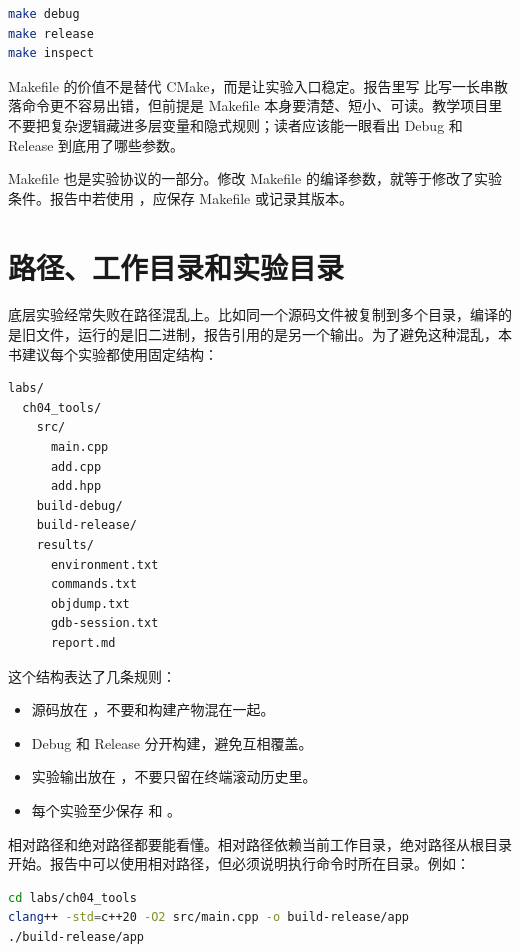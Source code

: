 \begin{lstlisting}[language=bash]
make debug
make release
make inspect
\end{lstlisting}

Makefile 的价值不是替代 CMake，而是让实验入口稳定。报告里写  比写一长串散落命令更不容易出错，但前提是 Makefile 本身要清楚、短小、可读。教学项目里不要把复杂逻辑藏进多层变量和隐式规则；读者应该能一眼看出 Debug 和 Release 到底用了哪些参数。

\begin{warningbox}
Makefile 也是实验协议的一部分。修改 Makefile 的编译参数，就等于修改了实验条件。报告中若使用 ，应保存 Makefile 或记录其版本。
\end{warningbox}

\section{路径、工作目录和实验目录}

底层实验经常失败在路径混乱上。比如同一个源码文件被复制到多个目录，编译的是旧文件，运行的是旧二进制，报告引用的是另一个输出。为了避免这种混乱，本书建议每个实验都使用固定结构：

\begin{lstlisting}
labs/
  ch04_tools/
    src/
      main.cpp
      add.cpp
      add.hpp
    build-debug/
    build-release/
    results/
      environment.txt
      commands.txt
      objdump.txt
      gdb-session.txt
      report.md
\end{lstlisting}

这个结构表达了几条规则：

\begin{itemize}
  \item 源码放在 ，不要和构建产物混在一起。
  \item Debug 和 Release 分开构建，避免互相覆盖。
  \item 实验输出放在 ，不要只留在终端滚动历史里。
  \item 每个实验至少保存  和 。
\end{itemize}

相对路径和绝对路径都要能看懂。相对路径依赖当前工作目录，绝对路径从根目录开始。报告中可以使用相对路径，但必须说明执行命令时所在目录。例如：

\begin{lstlisting}[language=bash]
cd labs/ch04_tools
clang++ -std=c++20 -O2 src/main.cpp -o build-release/app
./build-release/app
\end{lstlisting}

